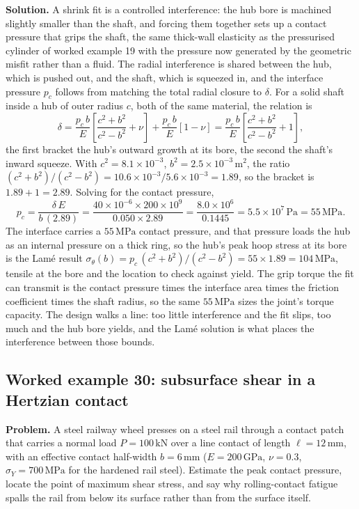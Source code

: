 \textbf{Solution.} A shrink fit is a controlled interference: the hub bore
is machined slightly smaller than the shaft, and forcing them together sets
up a contact pressure that grips the shaft, the same thick-wall elasticity
as the pressurised cylinder of worked example 19 with the pressure now
generated by the geometric misfit rather than a fluid. The radial
interference is shared between the hub, which is pushed out, and the shaft,
which is squeezed in, and the interface pressure $p_c$ follows from matching
the total radial closure to $\delta$. For a solid shaft inside a hub of
outer radius $c$, both of the same material, the relation is
\[
\delta = \frac{p_c\, b}{E}\left[\frac{c^2 + b^2}{c^2 - b^2} + \nu\right]
+ \frac{p_c\, b}{E}\left[1 - \nu\right]
= \frac{p_c\, b}{E}\left[\frac{c^2 + b^2}{c^2 - b^2} + 1\right],
\]
the first bracket the hub's outward growth at its bore, the second the
shaft's inward squeeze. With $c^2 = 8.1\times 10^{-3}$, $b^2 = 2.5\times
10^{-3}\,\text{m}^2$, the ratio $(c^2+b^2)/(c^2-b^2) = 10.6\times 10^{-3}/
5.6\times 10^{-3} = 1.89$, so the bracket is $1.89 + 1 = 2.89$. Solving for
the contact pressure,
\[
p_c = \frac{\delta\,E}{b\,(2.89)}
= \frac{40\times 10^{-6}\times 200\times 10^9}{0.050\times 2.89}
= \frac{8.0\times 10^{6}}{0.1445}
= 5.5\times 10^{7}\,\text{Pa} = 55\,\text{MPa}.
\]
The interface carries a $55\,\text{MPa}$ contact pressure, and that pressure
loads the hub as an internal pressure on a thick ring, so the hub's peak
hoop stress at its bore is the Lam\'e result $\sigma_\theta(b) = p_c\,
(c^2+b^2)/(c^2-b^2) = 55\times 1.89 = 104\,\text{MPa}$, tensile at the bore
and the location to check against yield. The grip torque the fit can
transmit is the contact pressure times the interface area times the
friction coefficient times the shaft radius, so the same $55\,\text{MPa}$
sizes the joint's torque capacity. The design walks a line: too little
interference and the fit slips, too much and the hub bore yields, and the
Lam\'e solution is what places the interference between those bounds.

\subsection*{Worked example 30: subsurface shear in a Hertzian contact}



\textbf{Problem.} A steel railway wheel presses on a steel rail through a
contact patch that carries a normal load $P = 100\,\text{kN}$ over a line
contact of length $\ell = 12\,\si{\milli\meter}$, with an effective
contact half-width $b = 6\,\si{\milli\meter}$ ($E = 200\,\text{GPa}$,
$\nu = 0.3$, $\sigma_Y = 700\,\text{MPa}$ for the hardened rail steel).
Estimate the peak contact pressure, locate the point of maximum shear
stress, and say why rolling-contact fatigue spalls the rail from below its
surface rather than from the surface itself.

